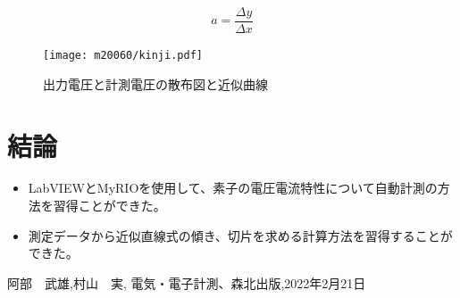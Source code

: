 \documentclass[11pt,dvipdfmx]{jarticle}
\begin{document}
	\begin{equation}
		a=\frac{\Delta y}{\Delta x}
		\label{katamuki}
	\end{equation}

	
	\begin{figure}[b]
		\centering
		\texttt{[image: m20060/kinji.pdf]}
		\caption{出力電圧と計測電圧の散布図と近似曲線}
		\label{fig:kinji}
	\end{figure}

\section{結論}
\begin{itemize}
	\item LabVIEWとMyRIOを使用して、素子の電圧電流特性について自動計測の方法を習得ことができた。
	\item 測定データから近似直線式の傾き、切片を求める計算方法を習得することができた。
\end{itemize}

\begin{thebibliography}{9}%
	 阿部　武雄,村山　実, 電気・電子計測、森北出版,2022年2月21日
\end{thebibliography}
\end{document}
